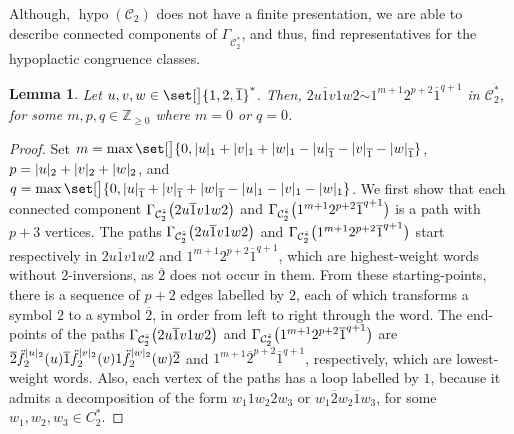\documentclass[a4paper,reqno]{amsart}
\numberwithin{equation}{section}
\theoremstyle{plain}
\newtheorem{lem}[thm]{Lemma}
\theoremstyle{definition}
\theoremstyle{remark}
\newcommand*{\Z}{\mathbb{Z}}               %
\DeclarePairedDelimiter{\parens}{\lparen}{\rparen}
\DeclarePairedDelimiter{\wlng}{\lvert}{\rvert}  %
\newcommand*{\wbar}[1]{\overline{#1}}  %
\newcommand*{\qcrst}[1]{\mathcal{#1}}
\newcommand*{\qKof}{\ddot{f}}
\newcommand*{\qctC}{\qcrst{C}}
\newcommand*{\fqcms}{{\ddot{*}}}      %
\DeclareMathOperator{\hypo}{hypo}
\newcommand*{\hyco}{\mathrel{\ddot{\sim}}}
\begin{document}
Although, $\hypo(\qctC_2)$ does not have a finite presentation, we are able to describe connected components of $\Gamma_{\qctC_2^\fqcms}$, and thus, find representatives for the hypoplactic congruence classes.

\begin{lem}
\label{lem:hypoc22ub1v1w212b1}
Let $u, v, w \in \set[\big]{ 1, 2, \wbar{1} }^*$.
Then, $2 u \wbar{1} v 1 w 2 \hyco 1^{m+1} 2^{p+2} \wbar{1}^{q+1}$ in $\qctC_2^\fqcms$, for some $m, p, q \in \Z_{\geq 0}$ where $m = 0$ or $q = 0$.
\end{lem}

\begin{proof}
Set $m = \max \set[\big]{ 0, \wlng{u}_1 + \wlng{v}_1 + \wlng{w}_1 - \wlng{u}_{\wbar{1}} - \wlng{v}_{\wbar{1}} - \wlng{w}_{\wbar{1}} }$,
$p = \wlng{u}_2 + \wlng{v}_2 + \wlng{w}_2$,
and $q = \max \set[\big]{ 0, \wlng{u}_{\wbar{1}} + \wlng{v}_{\wbar{1}} + \wlng{w}_{\wbar{1}} - \wlng{u}_1 - \wlng{v}_1 - \wlng{w}_1 }$.
We first show that each connected component $\Gamma_{\qctC_2^\fqcms} \parens[\big]{ 2 u \wbar{1} v 1 w 2 }$ and $\Gamma_{\qctC_2^\fqcms} \parens[\big]{ 1^{m+1} 2^{p+2} \wbar{1}^{q+1} }$ is a path with $p+3$ vertices.
The paths $\Gamma_{\qctC_2^\fqcms} \parens[\big]{ 2 u \wbar{1} v 1 w 2 }$ and $\Gamma_{\qctC_2^\fqcms} \parens[\big]{ 1^{m+1} 2^{p+2} \wbar{1}^{q+1} }$ start respectively in $2 u \wbar{1} v 1 w 2$ and $1^{m+1} 2^{p+2} \wbar{1}^{q+1}$, which are highest-weight words without $2$-inversions, as $\wbar{2}$ does not occur in them.
From these starting-points, there is a sequence of $p+2$ edges labelled by $2$, each of which transforms a symbol $2$ to a symbol $\wbar{2}$, in order from left to right through the word.
The end-points of the paths $\Gamma_{\qctC_2^\fqcms} \parens[\big]{ 2 u \wbar{1} v 1 w 2 }$ and $\Gamma_{\qctC_2^\fqcms} \parens[\big]{ 1^{m+1} 2^{p+2} \wbar{1}^{q+1} }$ are
$\wbar{2} \qKof_2^{\wlng{u}_2} (u) \wbar{1} \qKof_2^{\wlng{v}_2} (v) 1 \qKof_2^{\wlng{w}_2} (w) \wbar{2}$
and
$1^{m+1} \wbar{2}^{p+2} \wbar{1}^{q+1}$,
respectively, which are lowest-weight words.
Also, each vertex of the paths has a loop labelled by $1$, because it admits a decomposition of the form $w_1 1 w_2 2 w_3$ or $w_1 \wbar{2} w_2 \wbar{1} w_3$, for some $w_1, w_2, w_3 \in C_2^*$.


\end{proof}
\end{document}
